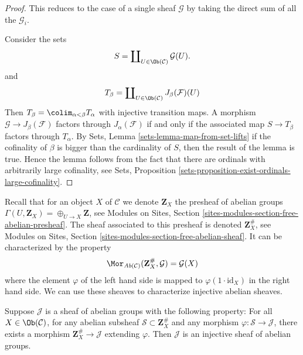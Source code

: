 \begin{proof}
This reduces to the case of a single sheaf $\mathcal{G}$
by taking the direct sum of all the $\mathcal{G}_i$.

\medskip\noindent
Consider the sets
$$
S = \coprod\nolimits_{U \in \Ob(\mathcal{C})} \mathcal{G}(U).
$$
and
$$
T_\beta
=
\coprod\nolimits_{U \in \Ob(\mathcal{C})} J_\beta(\mathcal{F})(U)
$$
Then $T_\beta = \colim_{\alpha < \beta} T_\alpha$
with injective transition maps.
A morphism $\mathcal{G} \to J_\beta(\mathcal{F})$ factors
through $J_\alpha(\mathcal{F})$ if and only if
the associated map $S \to T_\beta$ factors through $T_\alpha$.
By
Sets, Lemma \ref{sets-lemma-map-from-set-lifts}
if the cofinality of $\beta$ is bigger than the cardinality
of $S$, then the result of the lemma is true. Hence the lemma
follows from the fact that there are ordinals with arbitrarily
large cofinality, see
Sets, Proposition \ref{sets-proposition-exist-ordinals-large-cofinality}.
\end{proof}

\noindent
Recall that for an object $X$ of $\mathcal{C}$ we denote $\mathbf{Z}_X$
the presheaf of abelian groups $\Gamma(U, \mathbf{Z}_X) =
\oplus_{U \to X} \mathbf{Z}$, see
Modules on Sites, Section \ref{sites-modules-section-free-abelian-presheaf}.
The sheaf associated to this presheaf
is denoted $\mathbf{Z}_X^\#$, see
Modules on Sites, Section \ref{sites-modules-section-free-abelian-sheaf}.
It can be characterized by
the property
\begin{equation}
\label{equation-free-sheaf-on}
\Mor_{\textit{Ab}(\mathcal{C})}(\mathbf{Z}_X^\#, \mathcal{G})
=
\mathcal{G}(X)
\end{equation}
where the element $\varphi$ of the left hand side is mapped
to $\varphi(1 \cdot \text{id}_X)$ in the right hand side. We can use these
sheaves to characterize injective abelian sheaves.

\begin{lemma}
\label{lemma-characterize-injectives}
Suppose $\mathcal{J}$ is a sheaf of abelian groups with the following
property: For all $X\in \Ob(\mathcal{C})$, for any abelian subsheaf
$\mathcal{S} \subset \mathbf{Z}_X^\#$ and any morphism
$\varphi : \mathcal{S} \to \mathcal{J}$, there exists a morphism
$\mathbf{Z}_X^\# \to \mathcal{J}$ extending $\varphi$.
Then $\mathcal{J}$ is an injective sheaf of abelian groups.
\end{lemma}

